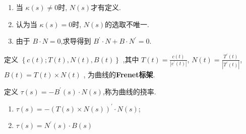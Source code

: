 \documentclass[../../古典微分几何.tex]{subfiles}
\begin{document}
\begin{remark}
   \begin{enumerate}
    \item  当 \(   \kappa  \left( s \right)\neq    0\)时, \(  N\left( s \right)   \)才有定义.
    \item 认为当 \(   \kappa  \left( s \right)= 0   \)时, \(  N\left( s \right)   \)的选取不唯一.
    \item 由于 \(  B\cdot N= 0  \),求导得到 \(  B^{\prime} \cdot N+  B\cdot N^{\prime} = 0  \).    
   \end{enumerate}
     
\end{remark}


\begin{definition}
    定义 \(  \left\{ c\left( t \right);T\left( t \right),N\left( t \right),B\left( t \right)     \right\}  \) ,其中 \(  T\left( t \right)=  \frac{c\left( t \right)  }{\left| c^{\prime} \left( t \right)  \right|  }    \), \(  N\left( t \right)=  \frac{T^{\prime} \left( t \right)  }{\left| T^{\prime} \left( t \right)  \right|  }    \), \(  B\left( t \right)=  T\left( t \right)\times N\left( t \right)     \)   ,
    为曲线的\textbf{Frenet标架}.
\end{definition}

\begin{definition}
    定义 \(  \tau \left( s \right)=  -B^{\prime} \left( s \right)\cdot N\left( s \right)     \),称为曲线的挠率. 
\end{definition}

\begin{remark}
    \begin{enumerate}
        \item \(  \tau \left( s \right)= - \left( T\left( s \right)\times N\left( s \right)   \right)^{\prime} \cdot N\left( s \right)     \);
        \item \(  \tau \left( s \right) =  N^{\prime} \left( s \right)\cdot B\left( s \right)     \)  
    \end{enumerate}
    
\end{remark}
\end{document}
